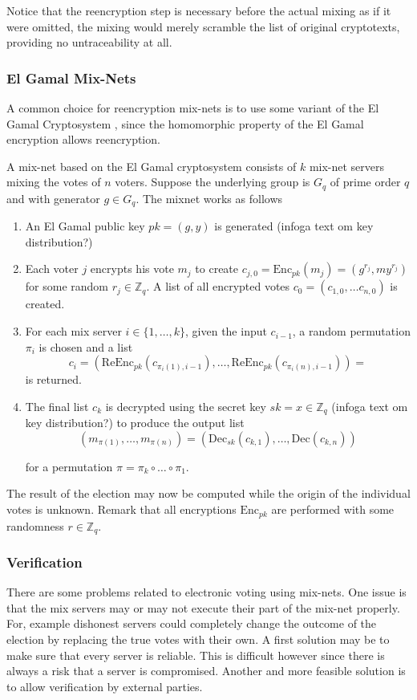 Notice that the reencryption step is necessary before the actual
mixing as if it were omitted, the mixing would merely scramble the
list of original cryptotexts, providing no untraceability at all.

\subsubsection{El Gamal Mix-Nets}

A common choice for reencryption mix-nets is to use some variant of
the El Gamal Cryptosystem \cite{electronicvoting}, since the
homomorphic property of the El Gamal encryption allows reencryption.

A mix-net based on the El Gamal cryptosystem consists of $k$ mix-net
servers mixing the votes of $n$ voters. Suppose the underlying group
is $G_q$ of prime order $q$ and with generator $g \in G_q$. The mixnet
works as follows \cite{electronicvoting2}\\

\begin{enumerate}
\item An El Gamal public key $pk = (g,y)$ is generated (infoga text om key distribution?)
\item Each voter $j$ encrypts his vote $m_j$ to create $c_{j,0} =
  \mathrm{Enc}_{pk}(m_j) = (g^{r_j},my^{r_j})$ for some random $r_j
  \in \mathbb{Z}_q$.  A list of all encrypted votes $c_0 = \left(
  c_{1,0}, \hdots c_{n,0}\right)$ is created.
\item For each mix server $i \in \{1,\hdots, k\}$, given the input
  $c_{i-1}$, a random permutation $\pi _i$ is chosen and a list 
  $$ 
  c_i =\left(\mathrm{ReEnc}_{pk}(c_{\pi_i(1),i-1}), \hdots,
  \mathrm{ReEnc}_{pk}(c_{\pi_i(n), i-1})\right) =
  $$
  is returned.
\item The final list $c_k$ is decrypted using the secret key $sk = x
  \in \mathbb{Z}_q$ (infoga text om key distribution?) to produce
  the output list
 $$ 
  (m_{\pi (1)}, \hdots , m_{\pi (n)}) =
  \left(\mathrm{Dec}_{sk}(c_{k,1}), \hdots, \mathrm{Dec}(c_{k,n})\right)
  $$
  
  for a permutation $\pi = \pi_k \circ \hdots \circ \pi_1$.
\end{enumerate}

 The result of the election may now be computed while the origin of
 the individual votes is unknown. Remark that all encryptions
 $\mathrm{Enc}_{pk}$ are performed with some randomness $r \in
 \mathbb{Z}_q$.

\subsubsection{Verification}
There are some problems related to electronic voting using
mix-nets. One issue is that the mix servers may or may not execute
their part of the mix-net properly. For, example dishonest servers
could completely change the outcome of the election by replacing the
true votes with their own. A first solution may be to make sure that
every server is reliable. This is difficult however since there is
always a risk that a server is compromised. Another and more feasible
solution is to allow verification by external parties.

